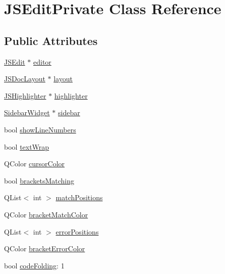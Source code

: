 \hypertarget{class_j_s_edit_private}{}\section{J\+S\+Edit\+Private Class Reference}
\label{class_j_s_edit_private}
\subsection*{Public Attributes}
\begin{DoxyCompactItemize}
\item 
\hyperlink{class_j_s_edit}{J\+S\+Edit} $\ast$ \hyperlink{class_j_s_edit_private_a84ea496037050dee940838f5183cfacb}{editor}
\item 
\hyperlink{class_j_s_doc_layout}{J\+S\+Doc\+Layout} $\ast$ \hyperlink{class_j_s_edit_private_a50545172a9cbef52c9e60bbfc3a72aab}{layout}
\item 
\hyperlink{class_j_s_highlighter}{J\+S\+Highlighter} $\ast$ \hyperlink{class_j_s_edit_private_a389e656a38309d2ca107cdd24aad7cad}{highlighter}
\item 
\hyperlink{class_sidebar_widget}{Sidebar\+Widget} $\ast$ \hyperlink{class_j_s_edit_private_a44ba07d9a266dc8564bd1c9c49a6b49d}{sidebar}
\item 
bool \hyperlink{class_j_s_edit_private_aa41ada65e23a14ca6e3cfd185319d31b}{show\+Line\+Numbers}
\item 
bool \hyperlink{class_j_s_edit_private_a19bda76829866effa8e7a3584c17046d}{text\+Wrap}
\item 
Q\+Color \hyperlink{class_j_s_edit_private_af2b74266165e4f699020ef323df40edc}{cursor\+Color}
\item 
bool \hyperlink{class_j_s_edit_private_a4c6d5ec871bbecbf5935bc4edbc7fc06}{brackets\+Matching}
\item 
Q\+List$<$ int $>$ \hyperlink{class_j_s_edit_private_aee03b335d00e461cb9d5680929905460}{match\+Positions}
\item 
Q\+Color \hyperlink{class_j_s_edit_private_a2df53cb7c39526e4a7097e3ee8629ed1}{bracket\+Match\+Color}
\item 
Q\+List$<$ int $>$ \hyperlink{class_j_s_edit_private_a7da559d25caa994e6d6ea01aec03cc74}{error\+Positions}
\item 
Q\+Color \hyperlink{class_j_s_edit_private_a200ba1f71ffa2d0e5e91f3d154f5b21f}{bracket\+Error\+Color}
\item 
bool \hyperlink{class_j_s_edit_private_a557c4d91113b1b5fd67fd803d581f16e}{code\+Folding}\+: 1
\end{DoxyCompactItemize}


